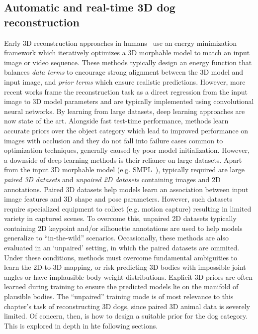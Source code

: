 \subsection{Automatic and real-time 3D dog reconstruction}

Early 3D reconstruction approaches in humans~ use an energy minimization framework which iteratively optimizes a 3D morphable model to match an input image or video sequence. These methods typically design an energy function that balances \emph{data terms} to encourage strong alignment between the 3D model and input image, and \emph{prior terms} which ensure realistic predictions. However, more recent works frame the reconstruction task as a direct regression from the input image to 3D model parameters and are typically implemented using convolutional neural networks. By learning from large datasets, deep learning approaches are now state of the art. Alongside fast test-time performance, methods learn accurate priors over the object category which lead to improved performance on images with occlusion and they do not fall into failure cases common to optimization techniques, generally caused by poor model initialization. However, a downside of deep learning methods is their reliance on large datasets. Apart from the input 3D morphable model (e.g. SMPL~), typically required are large \emph{paired 3D datasets} and \emph{unpaired 2D datasets} containing images and 2D annotations. Paired 3D datasets help models learn an association between input image features and 3D shape and pose parameters. However, such datasets require specialized equipment to collect (e.g. motion capture) resulting in limited variety in captured scenes. To overcome this, unpaired 2D datasets typically containing 2D keypoint and/or silhouette annotations are used to help models generalize to ``in-the-wild'' scenarios. Occasionally, these methods are also evaluated in an `unpaired' setting, in which the paired datasets are ommited. Under these conditions, methods must overcome fundamental ambiguities to learn the 2D-to-3D mapping, or risk predicting 3D bodies with impossible joint angles or have implausible body weight distributions. Explicit 3D priors are often learned during training to ensure the predicted models lie on the manifold of plausible bodies. The ``unpaired'' training mode is of most relevance to this chapter's task of reconstructing 3D dogs, since paired 3D animal data is severely limited. Of concern, then, is how to design a suitable prior for the dog category. This is explored in depth in hte following sections.

